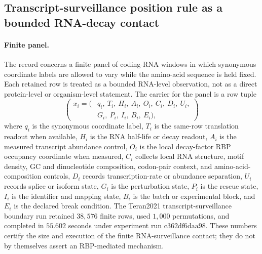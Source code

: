 
\subsection{Transcript-surveillance position rule as a bounded RNA-decay contact}
\label{sec:bioreality-transcript-surveillance-nmd-position-rule-teran2021}

\paragraph{Finite panel.}
The record concerns a finite panel of coding-RNA windows in which synonymous coordinate labels are allowed to vary while the amino-acid sequence is held fixed.  Each retained row is treated as a bounded RNA-level observation, not as a direct protein-level or organism-level statement.  The carrier for the panel is a row tuple
$$(\begin{aligned}
  x_i = (&q_i,\ T_i,\ H_i,\ A_i,\ O_i,\ C_i,\ D_i,\ U_i,\\
         &G_i,\ P_i,\ I_i,\ B_i,\ E_i),
\end{aligned})$$
where $q_i$ is the synonymous coordinate label, $T_i$ is the same-row translation readout when available, $H_i$ is the RNA half-life or decay readout, $A_i$ is the measured transcript abundance control, $O_i$ is the local decay-factor RBP occupancy coordinate when measured, $C_i$ collects local RNA structure, motif density, GC and dinucleotide composition, codon-pair context, and amino-acid-composition controls, $D_i$ records transcription-rate or abundance separation, $U_i$ records splice or isoform state, $G_i$ is the perturbation state, $P_i$ is the rescue state, $I_i$ is the identifier and mapping state, $B_i$ is the batch or experimental block, and $E_i$ is the declared break condition.  The Teran2021 transcript-surveillance boundary run retained $38{,}576$ finite rows, used $1{,}000$ permutations, and completed in $55.602$ seconds under experiment run $\mathrm{c362df6daa98}$.  These numbers certify the size and execution of the finite RNA-surveillance contact; they do not by themselves assert an RBP-mediated mechanism.

